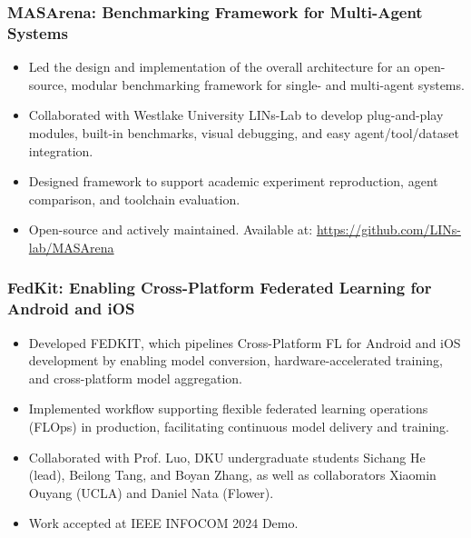 \documentclass[10pt,a4paper]{article}
\begin{document}
    \subsubsection*{\color{itemcolor}MASArena: Benchmarking Framework for Multi-Agent Systems}
    \begin{itemize}[leftmargin=*, label=\textcolor{accentcolor}{\textbullet}]
        \item Led the design and implementation of the overall architecture for an open-source, modular benchmarking framework for single- and multi-agent systems.
        \item Collaborated with Westlake University LINs-Lab to develop plug-and-play modules, built-in benchmarks, visual debugging, and easy agent/tool/dataset integration.
        \item Designed framework to support academic experiment reproduction, agent comparison, and toolchain evaluation.
        \item Open-source and actively maintained. Available at: \href{https://github.com/LINs-lab/MASArena}{\color{linkcolor}https://github.com/LINs-lab/MASArena}
    \end{itemize}
    \vspace{0.6em}
    \subsubsection*{\color{itemcolor}FedKit: Enabling Cross-Platform Federated Learning for Android and iOS}
    \begin{itemize}[leftmargin=*, label=\textcolor{accentcolor}{\textbullet}]
        \item Developed FEDKIT, which pipelines Cross-Platform FL for Android and iOS development by enabling model conversion, hardware-accelerated training, and cross-platform model aggregation.
        \item Implemented workflow supporting flexible federated learning operations (FLOps) in production, facilitating continuous model delivery and training.
        \item Collaborated with Prof. Luo, DKU undergraduate students Sichang He (lead), Beilong Tang, and Boyan Zhang, as well as collaborators Xiaomin Ouyang (UCLA) and Daniel Nata (Flower).
        \item Work accepted at IEEE INFOCOM 2024 Demo.
    \end{itemize}
    \vspace{0.6em}
\end{document}
